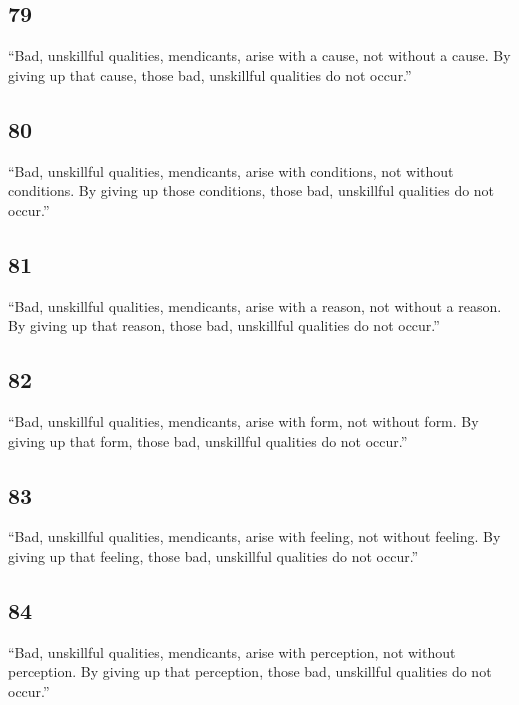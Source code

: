 \documentclass[12pt,openany]{book}%
\begin{document}
\subsection*{79 }

“Bad, unskillful qualities, mendicants, arise with a cause, not without a cause. By giving up that cause, those bad, unskillful qualities do not occur.” 

\subsection*{80 }

“Bad, unskillful qualities, mendicants, arise with conditions, not without conditions. By giving up those conditions, those bad, unskillful qualities do not occur.” 

\subsection*{81 }

“Bad, unskillful qualities, mendicants, arise with a reason, not without a reason. By giving up that reason, those bad, unskillful qualities do not occur.” 

\subsection*{82 }

“Bad, unskillful qualities, mendicants, arise with form, not without form. By giving up that form, those bad, unskillful qualities do not occur.” 

\subsection*{83 }

“Bad, unskillful qualities, mendicants, arise with feeling, not without feeling. By giving up that feeling, those bad, unskillful qualities do not occur.” 

\subsection*{84 }

“Bad, unskillful qualities, mendicants, arise with perception, not without perception. By giving up that perception, those bad, unskillful qualities do not occur.” 
\end{document}
